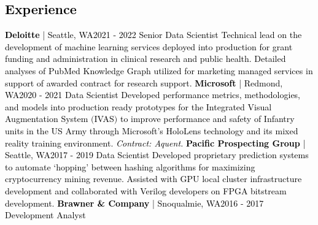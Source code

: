 \documentclass{article}
\begin{document}
    \begin{bgbox}[
        height = \paperheight,
        width = 0.69\textwidth,
        colback = white
    ]
        \textcolor{black}{
            \section*{Experience}
                \textbf{Deloitte} | Seattle, WA\hfill{2021 - 2022}\newline
                    Senior Data Scientist\newline\newline
                Technical lead on the development of machine learning services deployed into production for grant funding and administration in clinical research and public health. Detailed analyses of PubMed Knowledge Graph utilized for marketing managed services in support of awarded contract for research support.\newline\newline
                \textbf{Microsoft} | Redmond, WA\hfill{2020 - 2021}\newline
                    Data Scientist\newline\newline
                Developed performance metrics, methodologies, and models into production ready prototypes for the Integrated Visual Augmentation System $($IVAS$)$ to improve performance and safety of Infantry units in the US Army through Microsoft’s HoloLens technology and its mixed reality training environment. \textit{Contract: Aquent.}\newline\newline
                \textbf{Pacific Prospecting Group} | Seattle, WA\hfill{2017 - 2019}\newline
                    Data Scientist\newline\newline
                Developed proprietary prediction systems to automate ‘hopping’ between hashing algorithms for maximizing cryptocurrency mining revenue. Assisted with GPU local cluster infrastructure development and collaborated with Verilog developers on FPGA bitstream development.\newline\newline
                \textbf{Brawner \& Company} | Snoqualmie, WA\hfill{2016 - 2017}\newline
                    Development Analyst\newline\newline
}
\end{bgbox}
\end{document}
